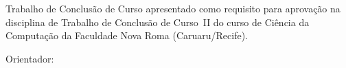 \begingroup
\singlespacing
\begin{center}
\vspace*{1.2cm}

{\bfseries \tccautor}

\vfill

{\large\bfseries \tcctitulo}
\end{center}

\vspace{1.2cm}

\noindent\hspace*{7cm}\begin{minipage}{7.5cm}
\singlespacing\small
Trabalho de Conclusão de Curso apresentado como requisito para aprovação na
disciplina de Trabalho de Conclusão de Curso~II do curso de Ciência da
Computação da Faculdade Nova Roma (Caruaru/Recife).

\vspace{0.8cm}
Orientador: \tccorientador
\end{minipage}

\vfill

\begin{center}
{\bfseries \MakeUppercase{\tcclocal}}\\[2pt]
{\bfseries \tccano}
\end{center}
\vspace*{0.6cm}
\endgroup
\newpage
